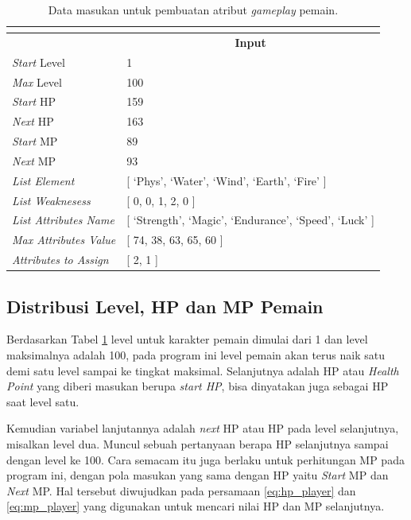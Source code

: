 \begin{longtable}{|l|l|}
	\caption{Data masukan untuk pembuatan atribut \textit{gameplay} pemain.}
	\vspace{1ex}
	\label{tb:player_input_variable}\\
	\hline
	\rowcolor[HTML]{9B9B9B} 
	\multicolumn{1}{|c|}{\cellcolor[HTML]{9B9B9B}\textbf{Variabel}} & \multicolumn{1}{c|}{\cellcolor[HTML]{9B9B9B}\textbf{Input}} \\ \hline
	\textit{Start} Level & 1 \\ \hline
	\textit{Max} Level & 100 \\ \hline
	\textit{Start} HP & 159 \\ \hline
	\textit{Next} HP & 163 \\ \hline
	\textit{Start} MP & 89 \\ \hline
	\textit{Next} MP & 93 \\ \hline
	\textit{List Element} & {[} `Phys', `Water', `Wind', `Earth', `Fire' {]} \\ \hline
	\textit{List Weaknesess} & {[} 0, 0, 1, 2, 0 {]} \\ \hline
	\textit{List Attributes Name} & {[} `Strength', `Magic', `Endurance', `Speed', `Luck' {]} \\ \hline
	\textit{Max Attributes Value} & {[} 74, 38, 63, 65, 60 {]} \\ \hline
	\textit{Attributes to Assign} & {[} 2, 1 {]} \\ \hline
\end{longtable}
\vspace{1ex}

\subsection{Distribusi Level, HP dan MP Pemain}
\label{sec:sub_sec3_player_level_hp_mp}
\vspace{1ex}

Berdasarkan Tabel \ref{tb:player_input_variable} level untuk karakter pemain dimulai dari 1 dan level maksimalnya adalah 100, pada program ini level pemain akan terus naik satu demi satu level sampai ke tingkat maksimal. Selanjutnya adalah HP atau \textit{Health Point} yang diberi masukan berupa \textit{start HP}, bisa dinyatakan juga sebagai HP saat level satu. 
\vspace{1ex}

Kemudian variabel lanjutannya adalah \textit{next} HP atau HP pada level selanjutnya, misalkan level dua. Muncul sebuah pertanyaan berapa HP selanjutnya sampai dengan level ke 100. Cara semacam itu juga berlaku untuk perhitungan MP pada program ini, dengan pola masukan yang sama dengan HP yaitu \textit{Start} MP dan \textit{Next} MP. Hal tersebut diwujudkan pada persamaan \ref{eq:hp_player} dan \ref{eq:mp_player} yang digunakan untuk mencari nilai HP dan MP selanjutnya.
\vspace{1ex}


